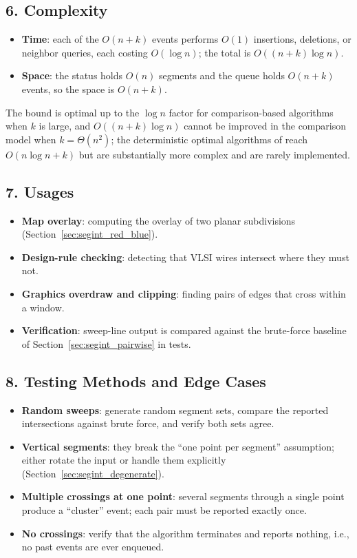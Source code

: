 \subsection{6. Complexity}

\begin{itemize}
\item \textbf{Time}: each of the $O(n+k)$ events performs $O(1)$
  insertions, deletions, or neighbor queries, each costing $O(\log n)$;
  the total is $O((n+k)\log n)$.
\item \textbf{Space}: the status holds $O(n)$ segments and the queue holds
  $O(n+k)$ events, so the space is $O(n+k)$.
\end{itemize}
The bound is optimal up to the $\log n$ factor for comparison-based
algorithms when $k$ is large, and $O((n+k)\log n)$ cannot be improved in
the comparison model when $k=\Theta(n^2)$; the deterministic optimal
algorithms of \cite{chazelle1992,balaban1995} reach $O(n\log n + k)$ but
are substantially more complex and are rarely implemented.

\subsection{7. Usages}

\begin{itemize}
\item \textbf{Map overlay}: computing the overlay of two planar
  subdivisions (Section~\ref{sec:segint_red_blue}).
\item \textbf{Design-rule checking}: detecting that VLSI wires intersect
  where they must not.
\item \textbf{Graphics overdraw and clipping}: finding pairs of edges that
  cross within a window.
\item \textbf{Verification}: sweep-line output is compared against the
  brute-force baseline of Section~\ref{sec:segint_pairwise} in tests.
\end{itemize}

\subsection{8. Testing Methods and Edge Cases}

\begin{itemize}
\item \textbf{Random sweeps}: generate random segment sets, compare the
  reported intersections against brute force, and verify both sets agree.
\item \textbf{Vertical segments}: they break the ``one point per segment''
  assumption; either rotate the input or handle them explicitly
  (Section~\ref{sec:segint_degenerate}).
\item \textbf{Multiple crossings at one point}: several segments through a
  single point produce a ``cluster'' event; each pair must be reported
  exactly once.
\item \textbf{No crossings}: verify that the algorithm terminates and
  reports nothing, i.e., no past events are ever enqueued.
\end{itemize}

